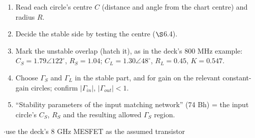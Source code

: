 \begin{enumerate}[label=\arabic*., leftmargin=1.4em, itemsep=1pt]
  \item Read each circle's centre $C$ (distance and angle from the chart centre) and radius $R$.
  \item Decide the stable side by testing the centre ($\S$6.4).
  \item Mark the unstable overlap (hatch it), as in the deck's 800 MHz example:
    $C_S = 1.79\angle122^\circ$, $R_S = 1.04$; $C_L = 1.30\angle48^\circ$, $R_L = 0.45$,
    $K = 0.547$.
  \item Choose $\Gamma_S$ and $\Gamma_L$ in the stable part, and for gain on the relevant
    constant-gain circles; confirm $|\Gamma_{in}|$, $|\Gamma_{out}| < 1$.
  \item ``Stability parameters of the input matching network'' (74 Bh) = the input circle's
    $C_S$, $R_S$ and the resulting allowed $\Gamma_S$ region.
\end{enumerate}

\vspace{2pt}

{\color{sub}\footnotesize {} \gap$\cdot$\gap use the deck's 8 GHz MESFET as the assumed transistor}

